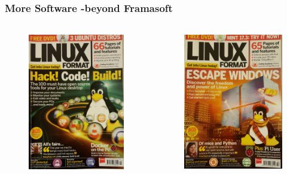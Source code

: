 \documentclass{beamer}
\begin{document}
	\begin{frame}
	\frametitle{More Software -beyond Framasoft}
	\framesubtitle{}
	\begin{columns}
	        	\begin{figure}[h]
               		\centering
                	\includegraphics[width=.8\textwidth]{./images/LF-201607}
        		\end{figure}
	        	\begin{figure}[h]
                	\centering
                	\includegraphics[width=.8\textwidth]{./images/LF-201602}

\end{figure}
\end{columns}
\end{frame}
\end{document}
